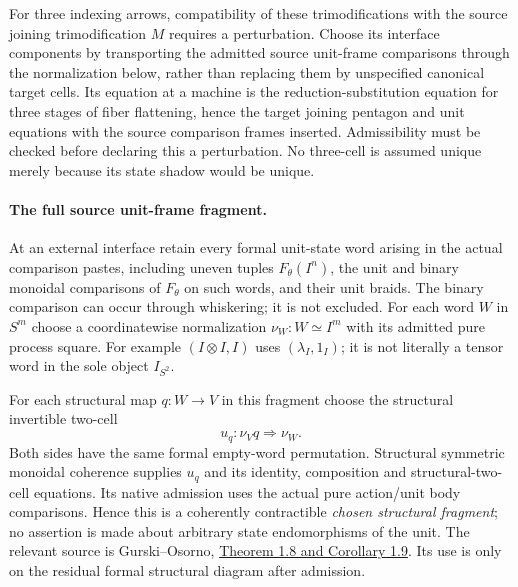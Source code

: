 \documentclass{article}
\begin{document}
For three indexing arrows, compatibility of these trimodifications with the source joining trimodification $M$ requires a perturbation. Choose its interface components by transporting the admitted source unit-frame comparisons through the normalization below, rather than replacing them by unspecified canonical target cells. Its equation at a machine is the reduction-substitution equation for three stages of fiber flattening, hence the target joining pentagon and unit equations with the source comparison frames inserted. Admissibility must be checked before declaring this a perturbation. No three-cell is assumed unique merely because its state shadow would be unique.

\paragraph{The full source unit-frame fragment.} At an external interface retain every formal unit-state word arising in the actual comparison pastes, including uneven tuples $F_\theta(I^n)$, the unit and binary monoidal comparisons of $F_\theta$ on such words, and their unit braids. The binary comparison can occur through whiskering; it is not excluded. For each word $W$ in $S^m$ choose a coordinatewise normalization $\nu_W:W\simeq I^m$ with its admitted pure process square. For example $(I\otimes I,I)$ uses $(\lambda_I,1_I)$; it is not literally a tensor word in the sole object $I_{S^2}$.

For each structural map $q:W\to V$ in this fragment choose the structural invertible two-cell
\[
 u_q:\nu_Vq\Rightarrow\nu_W.
\]
Both sides have the same formal empty-word permutation. Structural symmetric monoidal coherence supplies $u_q$ and its identity, composition and structural-two-cell equations. Its native admission uses the actual pure action/unit body comparisons. Hence this is a coherently contractible \emph{chosen structural fragment}; no assertion is made about arbitrary state endomorphisms of the unit. The relevant source is Gurski--Osorno, \href{https://arxiv.org/pdf/1210.1174v1}{Theorem 1.8 and Corollary 1.9}. Its use is only on the residual formal structural diagram after admission.
\end{document}
